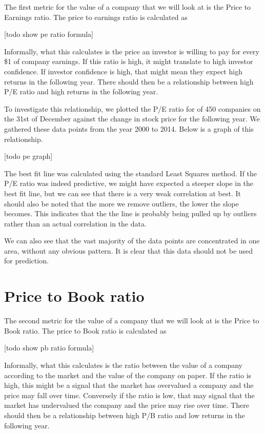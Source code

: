 \documentclass{report}
\begin{document}
The first metric for the value of a company that we will look at is the Price to Earnings ratio. The price to earnings ratio is calculated as

[todo show pe ratio formula]

Informally, what this calculates is the price an investor is willing to pay for every \$1 of company earnings. If this ratio is high, it might translate to high investor confidence. If investor confidence is high, that might mean they expect high returns in the following year. There should then be a relationship between high P/E ratio and high returns in the following year.

To investigate this relationship, we plotted the P/E ratio for of 450 companies on the 31st of December against the change in stock price for the following year. We gathered these data points from the year 2000 to 2014. Below is a graph of this relationship.

[todo pe graph]

The best fit line was calculated using the standard Least Squares method. If the P/E ratio was indeed predictive, we might have expected a steeper slope in the best fit line, but we can see that there is a very weak correlation at best. It should also be noted that the more we remove outliers, the lower the slope becomes. This indicates that the the line is probably being pulled up by outliers rather than an actual correlation in the data. 

We can also see that the vast majority of the data points are concentrated in one area, without any obvious pattern. It is clear that this data should not be used for prediction.

\section{Price to Book ratio}

The second metric for the value of a company that we will look at is the Price to Book ratio. The price to Book ratio is calculated as

[todo show pb ratio formula]

Informally, what this calculates is the ratio between the value of a company according to the market and the value of the company on paper. If the ratio is high, this might be a signal that the market has overvalued a company and the price may fall over time. Conversely if the ratio is low, that may signal that the market has undervalued the company and the price may rise over time. There should then be a relationship between high P/B ratio and low returns in the following year. 
\end{document}
